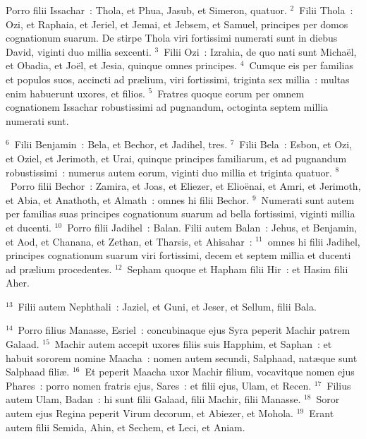 \lettrine[lines=3,image=true,loversize=0.05,lraise=-0.03]{P}{}orro filii Issachar~: Thola, et Phua, Jasub, et Simeron, quatuor.
${}^{2}$~Filii Thola~: Ozi, et Raphaia, et Jeriel, et Jemai, et Jebsem, et Samuel, principes per domos cognationum suarum. De stirpe Thola viri fortissimi numerati sunt in diebus David, viginti duo millia sexcenti.
${}^{3}$~Filii Ozi~: Izrahia, de quo nati sunt Micha\"el, et Obadia, et Jo\"el, et Jesia, quinque omnes principes.
${}^{4}$~Cumque eis per familias et populos suos, accincti ad pr\ae lium, viri fortissimi, triginta sex millia~: multas enim habuerunt uxores, et filios.
${}^{5}$~Fratres quoque eorum per omnem cognationem Issachar robustissimi ad pugnandum, octoginta septem millia numerati sunt.


${}^{6}$~Filii Benjamin~: Bela, et Bechor, et Jadihel, tres.
${}^{7}$~Filii Bela~: Esbon, et Ozi, et Oziel, et Jerimoth, et Urai, quinque principes familiarum, et ad pugnandum robustissimi~: numerus autem eorum, viginti duo millia et triginta quatuor.
${}^{8}$~Porro filii Bechor~: Zamira, et Joas, et Eliezer, et Elio\"enai, et Amri, et Jerimoth, et Abia, et Anathoth, et Almath~: omnes hi filii Bechor.
${}^{9}$~Numerati sunt autem per familias suas principes cognationum suarum ad bella fortissimi, viginti millia et ducenti.
${}^{10}$~Porro filii Jadihel~: Balan. Filii autem Balan~: Jehus, et Benjamin, et Aod, et Chanana, et Zethan, et Tharsis, et Ahisahar~:
${}^{11}$~omnes hi filii Jadihel, principes cognationum suarum viri fortissimi, decem et septem millia et ducenti ad pr\ae lium procedentes.
${}^{12}$~Sepham quoque et Hapham filii Hir~: et Hasim filii Aher.


${}^{13}$~Filii autem Nephthali~: Jaziel, et Guni, et Jeser, et Sellum, filii Bala.


${}^{14}$~Porro filius Manasse, Esriel~: concubinaque ejus Syra peperit Machir patrem Galaad.
${}^{15}$~Machir autem accepit uxores filiis suis Happhim, et Saphan~: et habuit sororem nomine Maacha~: nomen autem secundi, Salphaad, nat\ae que sunt Salphaad fili\ae .
${}^{16}$~Et peperit Maacha uxor Machir filium, vocavitque nomen ejus Phares~: porro nomen fratris ejus, Sares~: et filii ejus, Ulam, et Recen.
${}^{17}$~Filius autem Ulam, Badan~: hi sunt filii Galaad, filii Machir, filii Manasse.
${}^{18}$~Soror autem ejus Regina peperit Virum decorum, et Abiezer, et Mohola.
${}^{19}$~Erant autem filii Semida, Ahin, et Sechem, et Leci, et Aniam.


